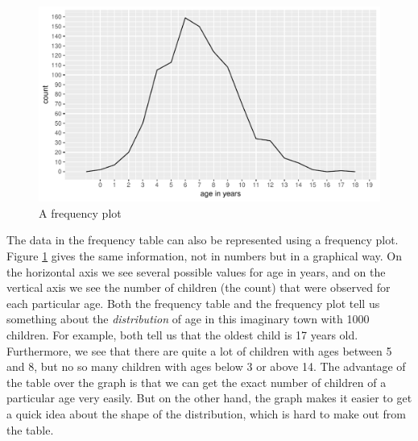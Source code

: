\documentclass[]{report}\usepackage[]{graphicx}\usepackage[]{color}
\makeatletter
\def\maxwidth{ %
  \ifdim\Gin@nat@width>\linewidth
    \linewidth
  \else
    \Gin@nat@width
  \fi
}
\newenvironment{knitrout}{}{} %
\makeatother
\begin{document}
\begin{knitrout}
\color{fgcolor}\begin{figure}

{\centering \includegraphics[width=\maxwidth]{figure/distr_1-1} 

}

\caption[A frequency plot]{A frequency plot}\label{fig:distr_1}
\end{figure}


\end{knitrout}

The data in the frequency table can also be represented using a frequency plot. Figure \ref{fig:distr_1} gives the same information, not in numbers but in a graphical way. On the horizontal axis we see several possible values for age in years, and on the vertical axis we see the number of children (the count) that were observed for each particular age. Both the frequency table and the frequency plot tell us something about the \textit{distribution} of age in this imaginary town with 1000 children. For example, both tell us that the oldest child is 17 years old. Furthermore, we see that there are quite a lot of children with ages between 5 and 8, but no so many children with ages below 3 or above 14. The advantage of the table over the graph is that we can get the exact number of children of a particular age very easily. But on the other hand, the graph makes it easier to get a quick idea about the shape of the distribution, which is hard to make out from the table.

\end{document}
